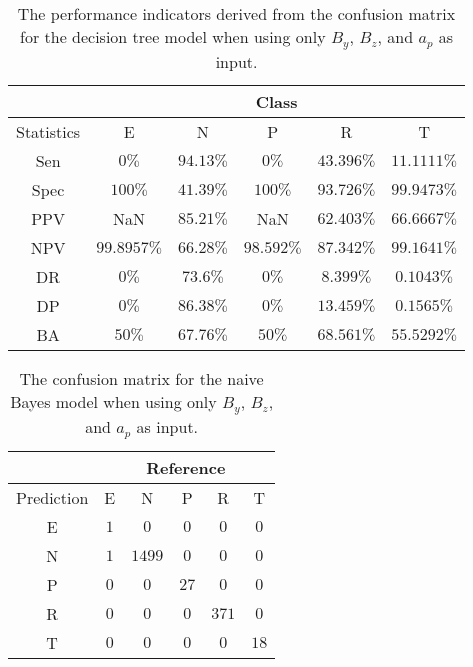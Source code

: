 \begin{table}[!ht]
	\centering
	\begin{tabular}{|c|c|c|c|c|c|}
		\hline
		 & \multicolumn{5}{c|}{Class} \\ \hline
		Statistics & E & N & P & R & T \\ \hline
		Sen & $0\%$ & $94.13\%$ & $0\%$ & $43.396\%$ & $11.1111\%$ \\ \hline
		Spec & $100\%$ & $41.39\%$ & $100\%$ & $93.726\%$ & $99.9473\%$ \\ \hline
		PPV & NaN & $85.21\%$ & NaN & $62.403\%$ & $66.6667\%$ \\ \hline
		NPV & $99.8957\%$ & $66.28\%$ & $98.592\%$ & $87.342\%$ & $99.1641\%$ \\ \hline
		DR & $0\%$ & $73.6\%$ & $0\%$ & $8.399\%$ & $0.1043\%$ \\ \hline
		DP & $0\%$ & $86.38\%$ & $0\%$ & $13.459\%$ & $0.1565\%$ \\ \hline
		BA & $50\%$ & $67.76\%$ & $50\%$ & $68.561\%$ & $55.5292\%$ \\ \hline
	\end{tabular}
	\caption{The performance indicators derived from the confusion matrix for the decision tree model when using only $B_{y}$, $B_{z}$, and $a_{p}$ as input.}
	\label{tab:cs:reverse:yzap:C5.0}
\end{table}

\begin{table}[!ht]
	\centering
	\begin{tabular}{|c|c|c|c|c|c|}
		\hline
		 & \multicolumn{5}{|c|}{Reference} \\ \hline
		 Prediction & E & N & P & R & T \\ \hline
		 E & $1$ & $0$ & $0$ & $0$ & $0$ \\ \hline
		 N & $1$ & $1499$ & $0$ & $0$ & $0$ \\ \hline
		 P & $0$ & $0$ & $27$ & $0$ & $0$ \\ \hline
		 R & $0$ & $0$ & $0$ & $371$ & $0$ \\ \hline
		 T & $0$ & $0$ & $0$ & $0$ & $18$ \\ \hline
	\end{tabular}
	\caption{The confusion matrix for the naive Bayes model when using only $B_{y}$, $B_{z}$, and $a_{p}$ as input.}
	\label{tab:cm:yzap:nb}
\end{table}

